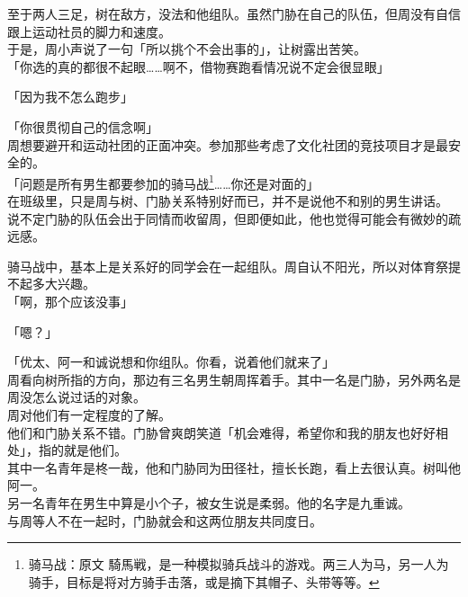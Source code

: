 至于两人三足，树在敌方，没法和他组队。虽然门胁在自己的队伍，但周没有自信跟上运动社员的脚力和速度。\\

于是，周小声说了一句「所以挑个不会出事的」，让树露出苦笑。\\

「你选的真的都很不起眼……啊不，借物赛跑看情况说不定会很显眼」

「因为我不怎么跑步」

「你很贯彻自己的信念啊」\\

周想要避开和运动社团的正面冲突。参加那些考虑了文化社团的竞技项目才是最安全的。\\

「问题是所有男生都要参加的骑马战\footnote{骑马战：原文 {\jpfont 騎馬戦}，是一种模拟骑兵战斗的游戏。两三人为马，另一人为骑手，目标是将对方骑手击落，或是摘下其帽子、头带等等。}……你还是对面的」\\

在班级里，只是周与树、门胁关系特别好而已，并不是说他不和别的男生讲话。\\

说不定门胁的队伍会出于同情而收留周，但即便如此，他也觉得可能会有微妙的疏远感。

骑马战中，基本上是关系好的同学会在一起组队。周自认不阳光，所以对体育祭提不起多大兴趣。\\

「啊，那个应该没事」

「嗯？」

「优太、阿一和诚说想和你组队。你看，说着他们就来了」\\

周看向树所指的方向，那边有三名男生朝周挥着手。其中一名是门胁，另外两名是周没怎么说过话的对象。\\

周对他们有一定程度的了解。\\

他们和门胁关系不错。门胁曾爽朗笑道「机会难得，希望你和我的朋友也好好相处」，指的就是他们。\\

其中一名青年是柊一哉，他和门胁同为田径社，擅长长跑，看上去很认真。树叫他阿一。\\

另一名青年在男生中算是小个子，被女生说是柔弱。他的名字是九重诚。\\

与周等人不在一起时，门胁就会和这两位朋友共同度日。\\

